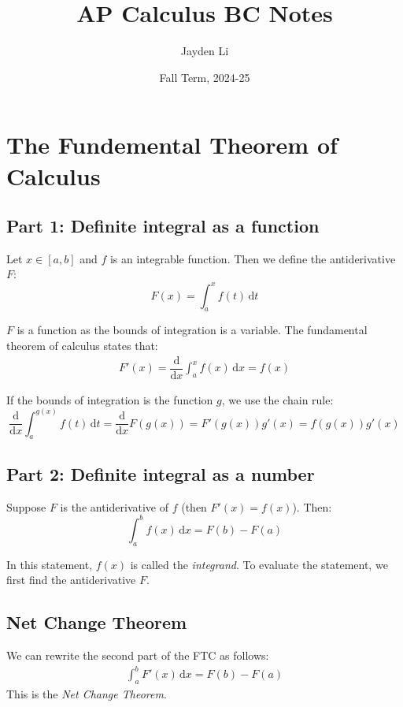 \documentclass[preview, margin=0.6in]{standalone}
\title{\vspace*{-30pt}AP Calculus BC Notes}
\author{Jayden Li}
\date{Fall Term, 2024-25}
\newcommand*{\deriv}[1][x]{\ensuremath{\dfrac{\mathrm{d}}{\mathrm{d}#1}}}
\begin{document}
\fontsize{14pt}{14pt}\selectfont
\setlength{\abovedisplayskip}{4pt}
\maketitle

\section{The Fundemental Theorem of Calculus}

\subsection{Part 1: Definite integral as a function}

Let $x\in[a,b]$ and $f$ is an integrable function. Then we define the antiderivative $F$:
\begin{equation*}
	F(x)=\int_{a}^{x}f(t)\,\mathrm{d}t
\end{equation*}

$F$ is a function as the bounds of integration is a variable. The fundamental theorem of calculus states that:
\begin{gather*}
	F'(x)=\deriv \int_{a}^{x}f(x)\,\mathrm{d}x=f(x)
\end{gather*}

If the bounds of integration is the function $g$, we use the chain rule:
\begin{equation*}
    \deriv \int_{a}^{g(x)}f(t)\,\mathrm{d}t=\deriv F(g(x))=F'(g(x))g'(x)=f(g(x))g'(x)
\end{equation*}

\subsection{Part 2: Definite integral as a number}
Suppose $F$ is the antiderivative of $f$ (then $F'(x)=f(x)$). Then:
\begin{equation*}
    \int_{a}^{b}f(x)\,\mathrm{d}x=F(b)-F(a)
\end{equation*}

In this statement, $f(x)$ is called the \textit{integrand}. To evaluate the statement, we first find the antiderivative $F$.

\subsection{Net Change Theorem}
We can rewrite the second part of the FTC as follows:
\begin{align*}
    \int_{a}^{b}F'(x)\,\mathrm{d}x=F(b)-F(a)
\end{align*}
This is the \textit{Net Change Theorem}.
\end{document}
